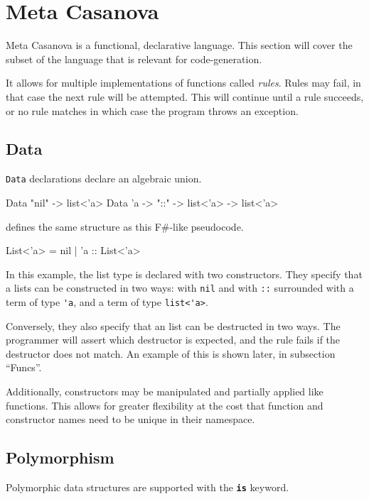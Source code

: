 \section{Meta Casanova}
  Meta Casanova is a functional, declarative language.
  This section will cover the subset of the language that is relevant for code-generation.

  It allows for multiple implementations of functions called \textit{rules}.
  Rules may fail, in that case the next rule will be attempted.
  This will continue until a rule succeeds, or no rule matches in which case the program throws an exception.
  
  \subsection{Data}
  \texttt{Data} declarations declare an algebraic union\cite{algenraic_datastructures}.

  \begin{code}
  Data "nil" -> list<'a>
  Data 'a -> "::" -> list<'a> -> list<'a>
  \end{code}

  defines the same structure as this F\#-like pseudocode.

  \begin{code}
  List<'a> = nil 
           | 'a :: List<'a>
  \end{code}

  In this example, the list type is declared with two constructors.
  They specify that a lists can be constructed in two ways: with \verb|nil| and with \verb|::| surrounded with a term of type \verb|'a|, and a term of type \verb|list<'a>|.

  Conversely, they also specify that an list can be destructed in two ways.
  The programmer will assert which destructor is expected, and the rule fails if the destructor does not match.
  An example of this is shown later, in subsection ``Funcs''.

  Additionally, constructors may be manipulated and partially applied like functions.
  This allows for greater flexibility at the cost that function and constructor names need to be unique in their namespace.

  \subsection{Polymorphism}
  Polymorphic data structures are supported with the \textbf{\texttt{is}} keyword.

